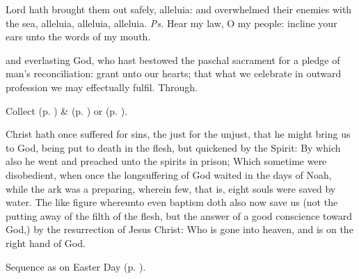 

\introit
{} Lord hath brought them out safely, alleluia: and overwhelmed their enemies with the sea, alleluia, alleluia, alleluia. \textit{Ps.} Hear my law, O my people: incline your ears unto the words of my mouth.

\collect
{} and everlasting God, who hast bestowed the paschal sacrament for a pledge of man's reconciliation: grant unto our hearts; that what we celebrate in outward profession we may effectually fulfil. Through.
\begin{rubric}
     Collect  (p. \pageref{EasterCollect}) \&   (p. \pageref{SPAgainst}) or  (p. \pageref{SPChiefBishop}).
\end{rubric}

 Christ hath once suffered for sins, the just for the unjust, that he might bring us to God, being put to death in the flesh, but quickened by the Spirit: By which also he went and preached unto the spirits in prison; Which sometime were disobedient, when once the longsuffering of God waited in the days of Noah, while the ark was a preparing, wherein few, that is, eight souls were saved by water. The like figure whereunto even baptism doth also now save us (not the putting away of the filth of the flesh, but the answer of a good conscience toward God,) by the resurrection of Jesus Christ: Who is gone into heaven, and is on the right hand of God.


\begin{rubric}
    Sequence as on Easter Day (p. \pageref{PaschalSequence}).
\end{rubric}

